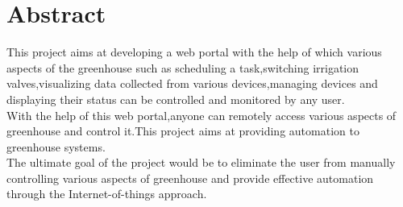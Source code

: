 \documentclass[a4paper,12pt,oneside]{book}
\begin{document}
\section{Abstract}
\hspace{7mm}This project aims at developing a web portal with the help of which various aspects of the greenhouse such as scheduling a task,switching irrigation valves,visualizing data collected from various devices,managing devices and displaying their status can be controlled and monitored by any user.\\

With the help of this web portal,anyone can remotely access various aspects of greenhouse and control it.This project aims at providing automation to greenhouse systems.\\

The ultimate goal of the project would be to eliminate the user from manually controlling various aspects of greenhouse and provide effective automation through the Internet-of-things approach.

\newpage
\end{document}
